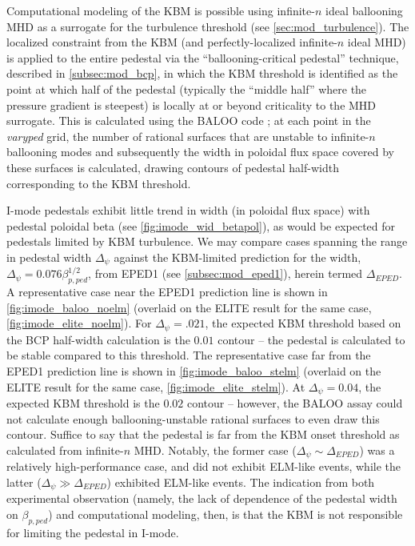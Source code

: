 Computational modeling of the KBM is possible using infinite-$n$ ideal ballooning MHD as a surrogate for the turbulence threshold \cite{Snyder2001,Candy2005,Snyder2009} (see \cref{sec:mod_turbulence}).  The localized constraint from the KBM (and perfectly-localized infinite-$n$ ideal MHD) is applied to the entire pedestal via the ``ballooning-critical pedestal'' technique, described in \cref{subsec:mod_bcp}, in which the KBM threshold is identified as the point at which half of the pedestal (typically the ``middle half'' where the pressure gradient is steepest) is locally at or beyond criticality to the MHD surrogate.  This is calculated using the BALOO code \cite{Connor1979,Miller1987}; at each point in the \emph{varyped} grid, the number of rational surfaces that are unstable to infinite-$n$ ballooning modes and subsequently the width in poloidal flux space covered by these surfaces is calculated, drawing contours of pedestal half-width corresponding to the KBM threshold.

I-mode pedestals exhibit little trend in width (in poloidal flux space) with pedestal poloidal beta (see \cref{fig:imode_wid_betapol}), as would be expected for pedestals limited by KBM turbulence.  We may compare cases spanning the range in pedestal width $\Delta_\psi$ against the KBM-limited prediction for the width, $\Delta_\psi = 0.076 \beta_{p,ped}^{1/2}$, from EPED1 (see \cref{subsec:mod_eped1}), herein termed $\Delta_{EPED}$.  A representative case near the EPED1 prediction line is shown in \cref{fig:imode_baloo_noelm} (overlaid on the ELITE result for the same case, \cref{fig:imode_elite_noelm}).  For $\Delta_\psi = .021$, the expected KBM threshold based on the BCP half-width calculation is the $0.01$ contour -- the pedestal is calculated to be stable compared to this threshold.  The representative case far from the EPED1 prediction line is shown in \cref{fig:imode_baloo_stelm} (overlaid on the ELITE result for the same case, \cref{fig:imode_elite_stelm}).  At $\Delta_\psi = 0.04$, the expected KBM threshold is the $0.02$ contour -- however, the BALOO assay could not calculate enough ballooning-unstable rational surfaces to even draw this contour.  Suffice to say that the pedestal is far from the KBM onset threshold as calculated from infinite-$n$ MHD.  Notably, the former case ($\Delta_\psi \sim \Delta_{EPED}$) was a relatively high-performance case, and did not exhibit ELM-like events, while the latter ($\Delta_\psi \gg \Delta_{EPED}$) exhibited ELM-like events.  The indication from both experimental observation (namely, the lack of dependence of the pedestal width on $\beta_{p,ped}$) and computational modeling, then, is that the KBM is not responsible for limiting the pedestal in I-mode.\nicesectionending

